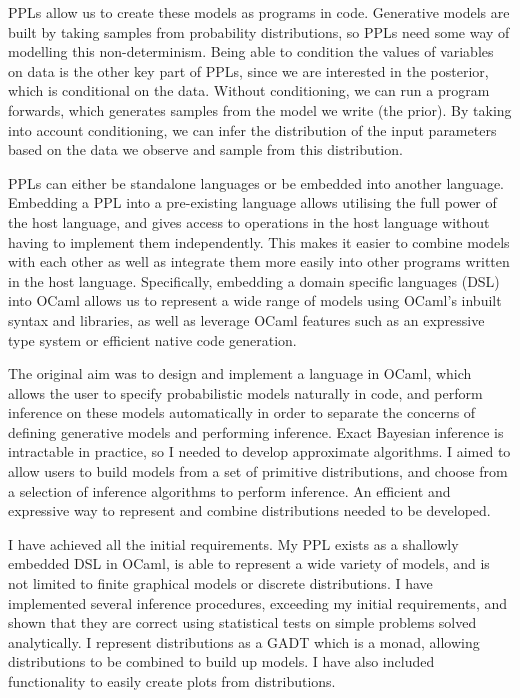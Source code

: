 \documentclass[sigconf]{acmart}
\begin{document}
PPLs allow us to create these models as programs in code. Generative models are built by taking samples from probability distributions, so PPLs need some way of modelling this non-determinism. Being able to condition the values of variables on data is the other key part of PPLs, since we are interested in the posterior, which is conditional on the data. Without conditioning, we can run a program forwards, which generates samples from the model we write (the prior). By taking into account conditioning, we can infer the distribution of the input parameters based on the data we observe and sample from this distribution.

PPLs can either be standalone languages or be embedded into another language. Embedding a PPL into a pre-existing language allows utilising the full power of the host language, and gives access to operations in the host language without having to implement them independently. This makes it easier to combine models with each other as well as integrate them more easily into other programs written in the host language. Specifically, embedding a domain specific languages (DSL) into OCaml allows us to represent a wide range of models using OCaml's inbuilt syntax and libraries, as well as leverage OCaml features such as an expressive type system or efficient native code generation.

The original aim was to design and implement a language in OCaml, which allows the user to specify probabilistic models naturally in code, and perform inference on these models automatically in order to separate the concerns of defining generative models and performing inference. Exact Bayesian inference is intractable in practice, so I needed to develop approximate algorithms. I aimed to allow users to build models from a set of primitive distributions, and choose from a selection of inference algorithms to perform inference. An efficient and expressive way to represent and combine distributions needed to be developed.

I have achieved all the initial requirements. My PPL exists as a shallowly embedded DSL in OCaml, is able to represent a wide variety of models, and is not limited to finite graphical models or discrete distributions. I have implemented several inference procedures, exceeding my initial requirements, and shown that they are correct using statistical tests on simple problems solved analytically. I represent distributions as a GADT which is a monad, allowing distributions to be combined to build up models. I have also included functionality to easily create plots from distributions.
\end{document}
